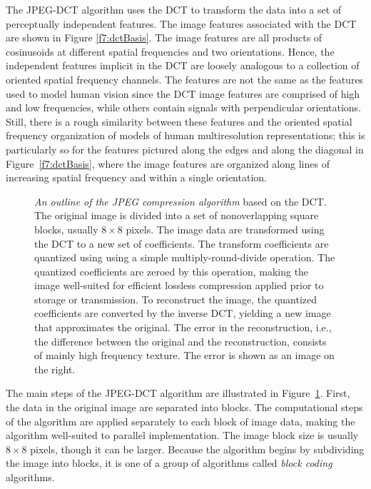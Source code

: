 The JPEG-DCT algorithm uses the DCT to transform the data into
a set of perceptually independent features.
The image features associated with the DCT are shown in Figure
\ref{f7:dctBasis}.  The image features are all products of cosinusoids
at different spatial frequencies and two orientations.  Hence, the
independent features implicit in the DCT are loosely analogous to a
collection of oriented spatial frequency channels.  The features are
not the same as the features used to model human vision since the DCT
image features are comprised of high and low frequencies, while others
contain signals with perpendicular orientations.  Still, there is a
rough similarity between these features and the oriented spatial
frequency organization of models of human multiresolution
representations; this is particularly so for the features pictured
along the edges and along the diagonal in Figure~\ref{f7:dctBasis},
where the image features are organized along lines of increasing
spatial frequency and within a single orientation.

\begin{figure}
\centerline{
}
\caption[DCT encoding]{
{\em An outline of the JPEG compression algorithm} based on the DCT.
The original image is divided into a set of nonoverlapping square
blocks, usually $8 \times 8$ pixels.  The image data are transformed
using the DCT to a new set of coefficients.  The transform
coefficients are quantized using using a simple multiply-round-divide
operation.  The quantized coefficients are zeroed by this operation,
making the image well-suited for efficient lossless compression
applied prior to storage or transmission.  To reconstruct the image,
the quantized coefficients are converted by the inverse DCT, yielding
a new image that approximates the original.  The error in the
reconstruction, i.e., the difference between the original and the
reconstruction, consists of mainly high frequency texture.  The error
is shown as an image on the right.}
\label{f7:dctAlgorithm}
\end{figure}
The main steps of the JPEG-DCT algorithm are illustrated in
Figure~\ref{f7:dctAlgorithm}.  First, the data in the original
image are separated into blocks.  The computational
steps of the algorithm are applied separately to
each block of image data, making the algorithm well-suited to parallel
implementation.  The image block size is usually $8 \times 8$
pixels, though it can be larger.  Because the algorithm begins by
subdividing the image into blocks, it is one of a group of algorithms
called {\em block coding} algorithms.

